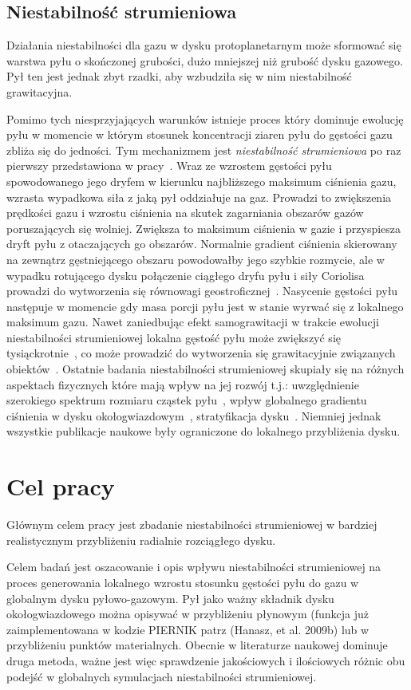 \subsection{Niestabilność strumieniowa}
Działania niestabilności dla gazu w dysku protoplanetarnym może sformować
się warstwa pyłu o skończonej grubości, dużo mniejszej niż grubość dysku
gazowego. Pył ten jest jednak zbyt rzadki, aby wzbudziła się w nim
niestabilność grawitacyjna.
\par Pomimo tych niesprzyjających warunków istnieje proces który dominuje
ewolucję pyłu w momencie w którym stosunek koncentracji ziaren pyłu do gęstości
gazu zbliża się do jedności. Tym mechanizmem jest {\it niestabilność
strumieniowa} po raz pierwszy przedstawiona w pracy~\cite{YG05}.  Wraz ze
wzrostem gęstości pyłu spowodowanego jego dryfem w kierunku najbliższego
maksimum ciśnienia gazu, wzrasta wypadkowa siła z jaką pył oddziałuje na gaz.
Prowadzi to zwiększenia prędkości gazu i wzrostu ciśnienia na skutek zagarniania
obszarów gazów poruszających się wolniej. Zwiększa to maksimum ciśnienia w gazie
i przyspiesza dryft pyłu z otaczających go obszarów. Normalnie gradient ciśnienia
skierowany na zewnątrz gęstniejącego obszaru powodowałby jego szybkie rozmycie,
ale w wypadku rotującego dysku połączenie ciągłego dryfu pyłu i siły Coriolisa
prowadzi do wytworzenia się równowagi geostroficznej~\cite{JBL11}. Nasycenie
gęstości pyłu następuje w momencie gdy masa porcji pyłu jest w stanie wyrwać się
z lokalnego maksimum gazu.  Nawet zaniedbując efekt samograwitacji w trakcie
ewolucji niestabilności strumieniowej lokalna gęstość pyłu może zwiększyć się
tysiąckrotnie~\cite{JY07}, co może prowadzić do wytworzenia się grawitacyjnie
związanych obiektów~\cite{J07}. Ostatnie badania niestabilności strumieniowej
skupiały się na różnych aspektach fizycznych które mają wpływ na jej rozwój
t.j.: uwzględnienie szerokiego spektrum rozmiaru cząstek pyłu~\cite{BS10a},
wpływ globalnego gradientu ciśnienia w dysku okołogwiazdowym~\cite{BS10b},
stratyfikacja dysku~\cite{T12}. Niemniej jednak wszystkie publikacje naukowe
były ograniczone do lokalnego przybliżenia dysku.

\section{Cel pracy}
Głównym celem pracy jest zbadanie niestabilności strumieniowej w bardziej
realistycznym przybliżeniu radialnie rozciągłego dysku.

Celem badań jest oszacowanie i opis wpływu niestabilności strumieniowej na
proces generowania lokalnego wzrostu stosunku gęstości pyłu do gazu w globalnym
dysku pyłowo-gazowym. Pył jako ważny składnik dysku okołogwiazdowego można
opisywać w przybliżeniu płynowym (funkcja już zaimplementowana w kodzie PIERNIK
patrz (Hanasz, et al. 2009b) lub w przybliżeniu punktów materialnych. Obecnie w
literaturze naukowej dominuje druga  metoda, ważne jest więc sprawdzenie
jakościowych i ilościowych różnic obu podejść w globalnych symulacjach
niestabilności strumieniowej. 



